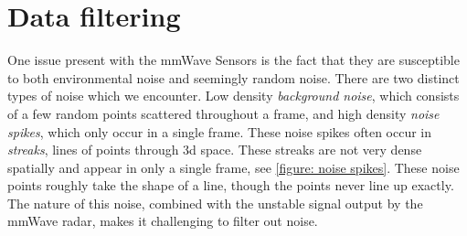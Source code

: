 \section{Data filtering}
\label{section: tracking method - data filtering}

One issue present with the mmWave Sensors is the fact that they are susceptible to both environmental noise and seemingly random noise. 
There are two distinct types of noise which we encounter.
Low density \textit{background noise}, which consists of a few random points scattered throughout a frame, and high density \textit{noise spikes}, which only occur in a single frame.
These noise spikes often occur in \textit{streaks}, lines of points through 3d space. 
These streaks are not very dense spatially and appear in only a single frame, see \cref{figure: noise spikes}.
These noise points roughly take the shape of a line, though the points never line up exactly.
The nature of this noise, combined with the unstable signal output by the mmWave radar, makes it challenging to filter out noise.



